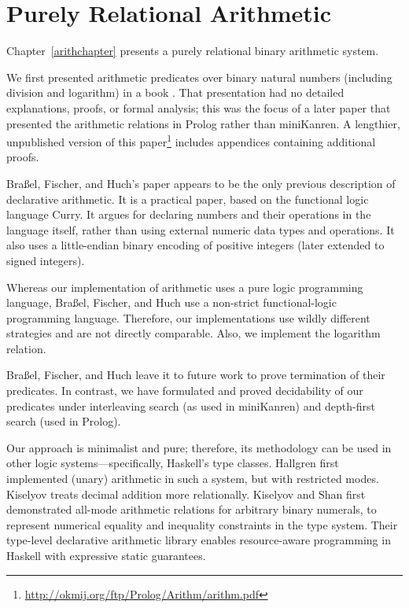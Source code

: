 \section{Purely Relational Arithmetic}\label{arithrelated}

Chapter~\ref{arithchapter} presents a purely relational binary
arithmetic system.

We first presented arithmetic predicates over binary natural numbers
(including division and logarithm) in a book \cite{trs}.  That
presentation had no detailed explanations, proofs, or formal analysis;
this was the focus of a later paper \cite{conf/flops/KiselyovBFS08}
that presented the arithmetic relations in Prolog rather than
miniKanren.  A lengthier, unpublished version of this
paper\footnote{\url{http://okmij.org/ftp/Prolog/Arithm/arithm.pdf}}
includes appendices containing additional proofs.

Bra{\ss}el, Fischer, and Huch's paper \citeyearpar{numbers-Curry}
appears to be the only previous description of declarative arithmetic.
It is a practical paper, based on the functional logic language Curry.
It argues for declaring numbers and their operations in the language
itself, rather than using external numeric data types and operations.
It also uses a little-endian binary encoding of positive integers
(later extended to signed integers).

Whereas our implementation of arithmetic uses a pure
logic programming language, Bra{\ss}el, Fischer, and Huch
use a non-strict functional-logic programming language.  Therefore,
our implementations use wildly different strategies and
are not directly comparable.  Also, we implement the logarithm relation.

Bra{\ss}el, Fischer, and Huch leave it to future work to prove
termination of their predicates.  In contrast, we have formulated and
proved decidability of our predicates under interleaving search (as
used in miniKanren) and depth-first search (used in Prolog).

Our approach is minimalist and pure; therefore, its methodology can be
used in other logic systems---specifically, Haskell's type classes.
Hallgren \citeyearpar{hallgren01fun} first implemented (unary)
arithmetic in such a system, but with restricted modes. Kiselyov
\citeyearpar[\S6]{npt} treats decimal addition more relationally.
Kiselyov and Shan \citeyearpar{lightweight-resources} first
demonstrated all-mode arithmetic relations for arbitrary binary
numerals, to represent numerical equality and inequality constraints
in the type system.  Their type-level declarative arithmetic library
enables resource-aware programming in Haskell with expressive static
guarantees.

